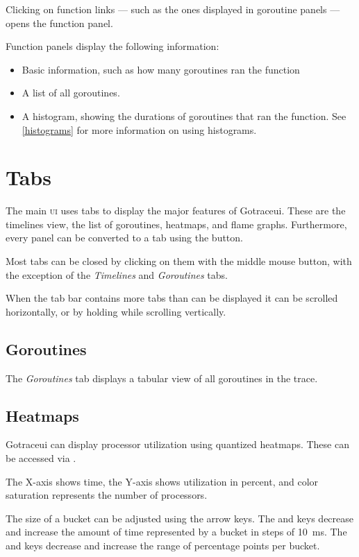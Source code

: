 \documentclass[10pt,letterpaper,oneside,openany,english]{memoir}
\begin{document}
Clicking on function links --- such as the ones displayed in goroutine panels --- opens the function panel.

Function panels display the following information:

\begin{itemize}
\item Basic information, such as how many goroutines ran the function
\item A list of all goroutines.
\item A histogram, showing the durations of goroutines that ran the function.
  See \cref{histograms} for more information on using histograms.
\end{itemize}

\section{Tabs}\label{tabs}

The main \textsc{ui} uses tabs to display the major features of Gotraceui.
These are the timelines view, the list of goroutines, heatmaps, and flame graphs.
Furthermore, every panel can be converted to a tab using the  button.

Most tabs can be closed by clicking on them with the middle mouse button,
with the exception of the \emph{Timelines} and \emph{Goroutines} tabs.

When the tab bar contains more tabs than can be displayed it can be scrolled horizontally,
or by holding \keys{\shift} while scrolling vertically.

\subsection{Goroutines}

The \emph{Goroutines} tab displays a tabular view of all goroutines in the trace.

\subsection{Heatmaps}

Gotraceui can display processor utilization using quantized heatmaps.
These can be accessed via .

The X-axis shows time, the Y-axis shows utilization in percent, and color saturation represents the number of processors.

The size of a bucket can be adjusted using the arrow keys. The \keys{\arrowkey{<}} and \keys{\arrowkey{>}} keys decrease and increase the amount of time represented by a bucket in steps of \qty{10}{\milli\second}.
The  and \keys{\arrowkey{^}} keys decrease and increase the range of percentage points per bucket.
\end{document}
